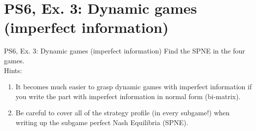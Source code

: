 \section{PS6, Ex. 3: Dynamic games (imperfect information)}

\begin{frame}{PS6, Ex. 3: Dynamic games (imperfect information)}
    Find the SPNE in the four games.\\\bigskip
    Hints:
    \begin{enumerate}
      \item It becomes much easier to grasp dynamic games with imperfect information if you write the part with imperfect information in normal form (bi-matrix).
      \item Be careful to cover all of the strategy profile (in every subgame!) when writing up the subgame perfect Nash Equilibria (SPNE).
    \end{enumerate}
    \vfill\null
\end{frame}


